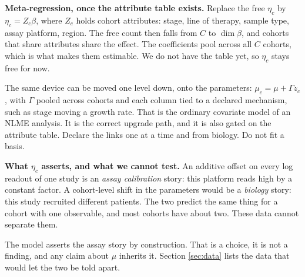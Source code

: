 \documentclass[11pt]{article}
\begin{document}
\textbf{Meta-regression, once the attribute table exists.} Replace the free
$\eta_c$ by $\eta_c = Z_c\beta$, where $Z_c$ holds cohort attributes: stage, line
of therapy, sample type, assay platform, region. The free count then falls from
$C$ to $\dim\beta$, and cohorts that share attributes share the effect. The
coefficients pool across all $C$ cohorts, which is what makes them estimable. We
do not have the table yet, so $\eta_c$ stays free for now.

The same device can be moved one level down, onto the parameters:
$\mu_c=\mu+\Gamma z_c$, with $\Gamma$ pooled across cohorts and each column tied
to a declared mechanism, such as stage moving a growth rate. That is the ordinary
covariate model of an NLME analysis. It is the correct upgrade path, and it is
also gated on the attribute table. Declare the links one at a time and from
biology. Do not fit a basis.

\begin{assumpbox}
\textbf{What $\eta_c$ asserts, and what we cannot test.} An additive offset on
every log readout of one study is an \emph{assay calibration} story: this
platform reads high by a constant factor. A cohort-level shift in the parameters
would be a \emph{biology} story: this study recruited different patients. The two
predict the same thing for a cohort with one observable, and most cohorts have
about two. These data cannot separate them.

The model asserts the assay story by construction. That is a choice, it is not a
finding, and any claim about $\mu$ inherits it. Section \ref{sec:data} lists the
data that would let the two be told apart.
\end{assumpbox}
\end{document}
